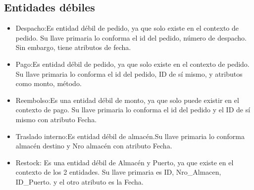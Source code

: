 \documentclass[10pt, a4paper,openany]{report}
\begin{document}
\subsection{Entidades débiles} %
\label{sub:Entidades débiles}
\begin{itemize}
	\item Despacho:Es entidad débil de pedido, ya que solo existe en el contexto de pedido. Su llave primaria lo conforma el id del pedido, número de despacho. Sin embargo, tiene atributos de fecha.
	\item Pago:Es entidad débil de pedido, ya que solo existe en el contexto de pedido. Su llave primaria lo conforma el id del pedido, ID de sí mismo, y atributos como monto, método.
	\item Reembolso:Es una entidad débil de monto, ya que solo puede existir en el contexto de pago. Su llave primaria lo conforma el id del pedido y el ID de sí mismo con atributo Fecha.
	\item Traslado interno:Es entidad débil de almacén.Su llave primaria lo  conforma almacén       destino y Nro almacén con atributo Fecha.
	\item Restock: Es una entidad débil de Almacén y Puerto, ya que existe en el contexto de los 2 entidades. Su llave primaria es ID, Nro\_Almacen, ID\_Puerto. y el otro atributo es la Fecha.

\end{itemize}

\end{document}
